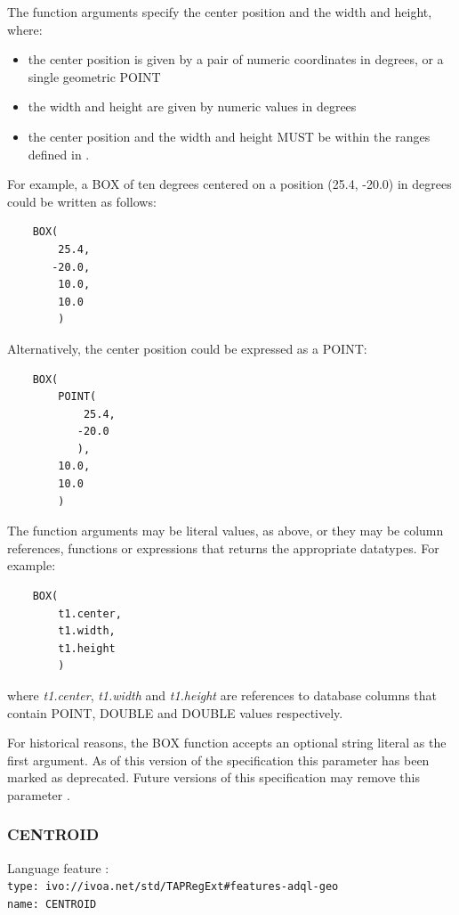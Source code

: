 \documentclass[11pt,a4paper]{ivoa}
\begin{document}
The function arguments specify the center position and the width and height,
where:
\begin{itemize}
    \item the center position is given by a pair of numeric coordinates
    in degrees, or a single geometric POINT
    \item the width and height are given by numeric values in degrees
    \item the center position and the width and height MUST be within the ranges defined in
    .
\end{itemize}

For example, a BOX of ten degrees centered on a position
(25.4, -20.0) in degrees could be written as follows:
\begin{verbatim}
    BOX(
        25.4,
       -20.0,
        10.0,
        10.0
        )
\end{verbatim}

Alternatively, the center position could be expressed as a POINT:
\begin{verbatim}
    BOX(
        POINT(
            25.4,
           -20.0
           ),
        10.0,
        10.0
        )
\end{verbatim}

The function arguments may be literal values, as above, or they may be
column references, functions or expressions that returns the appropriate
datatypes.
For example:
\begin{verbatim}
    BOX(
        t1.center,
        t1.width,
        t1.height
        )
\end{verbatim}
where \textit{t1.center}, \textit{t1.width} and \textit{t1.height}
are references to database columns that contain POINT, DOUBLE
and DOUBLE values respectively.

For historical reasons, the BOX function accepts an optional string literal as
the first argument.
As of this version of the specification this parameter has been
marked as deprecated.
Future versions of this specification may remove this parameter
.

\subsubsection{CENTROID}
\label{sec:functions.geom.centroid}
{\footnotesize Language feature :}\\
{\footnotesize \verb|type: ivo://ivoa.net/std/TAPRegExt#features-adql-geo|}\\
{\footnotesize \verb|name: CENTROID|}\\
\end{document}
